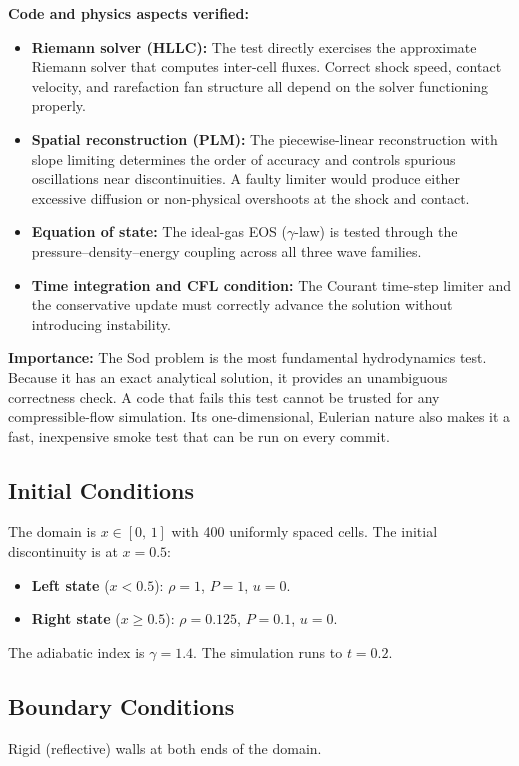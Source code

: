 \documentclass[11pt,a4paper]{article}
\begin{document}
\textbf{Code and physics aspects verified:}
\begin{itemize}
  \item \textbf{Riemann solver (HLLC):} The test directly exercises the approximate Riemann solver that computes inter-cell fluxes. Correct shock speed, contact velocity, and rarefaction fan structure all depend on the solver functioning properly.
  \item \textbf{Spatial reconstruction (PLM):} The piecewise-linear reconstruction with slope limiting determines the order of accuracy and controls spurious oscillations near discontinuities. A faulty limiter would produce either excessive diffusion or non-physical overshoots at the shock and contact.
  \item \textbf{Equation of state:} The ideal-gas EOS ($\gamma$-law) is tested through the pressure--density--energy coupling across all three wave families.
  \item \textbf{Time integration and CFL condition:} The Courant time-step limiter and the conservative update must correctly advance the solution without introducing instability.
\end{itemize}

\textbf{Importance:} The Sod problem is the most fundamental hydrodynamics test. Because it has an exact analytical solution, it provides an unambiguous correctness check. A code that fails this test cannot be trusted for any compressible-flow simulation. Its one-dimensional, Eulerian nature also makes it a fast, inexpensive smoke test that can be run on every commit.

\subsection*{Initial Conditions}
The domain is $x \in [0,\,1]$ with 400 uniformly spaced cells. The initial discontinuity is at $x = 0.5$:
\begin{itemize}
  \item \textbf{Left state} ($x < 0.5$): $\rho = 1$, $P = 1$, $u = 0$.
  \item \textbf{Right state} ($x \ge 0.5$): $\rho = 0.125$, $P = 0.1$, $u = 0$.
\end{itemize}
The adiabatic index is $\gamma = 1.4$. The simulation runs to $t = 0.2$.

\subsection*{Boundary Conditions}
Rigid (reflective) walls at both ends of the domain.
\end{document}
